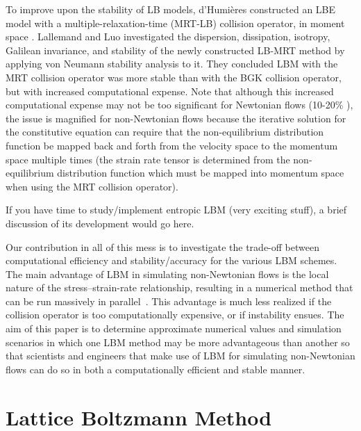 \documentclass{article}
\begin{document}
To improve upon the stability of LB models, d'Humi\`{e}res constructed an LBE model with a multiple-relaxation-time (MRT-LB) collision operator, in moment space \cite{d1994generalized}. %
Lallemand and Luo investigated the dispersion, dissipation, isotropy, Galilean invariance, and stability of the newly constructed LB-MRT method by applying von Neumann stability analysis to it\cite{lallemand2000theory}.
They concluded LBM with the MRT collision operator was more stable than with the BGK collision operator, but with increased computational expense. %
Note that although this increased computational expense may not be too significant for Newtonian flows (10-20\% \cite{lallemand2000theory}), the issue is magnified for non-Newtonian flows because the iterative solution for the constitutive equation can require that the non-equilibrium distribution function be mapped back and forth from the velocity space to the momentum space multiple times (the strain rate tensor is determined from the non-equilibrium distribution function which must be mapped into momentum space when using the MRT collision operator). %

{\color{red} If you have time to study/implement entropic LBM (very exciting stuff), a brief discussion of its development would go here.}

Our contribution in all of this mess is to investigate the trade-off between computational efficiency and stability/accuracy for the various LBM schemes.
The main advantage of LBM in simulating non-Newtonian flows is the local nature of the stress--strain-rate relationship, resulting in a numerical method that can be run massively in parallel~\cite{something}.
This advantage is much less realized if the collision operator is too computationally expensive, or if instability ensues.
The aim of this paper is to determine approximate numerical values and simulation scenarios in which one LBM method may be more advantageous than another so that scientists and engineers that make use of LBM for simulating non-Newtonian flows can do so in both a computationally efficient and stable manner. %

\section{Lattice Boltzmann Method}
\end{document}

